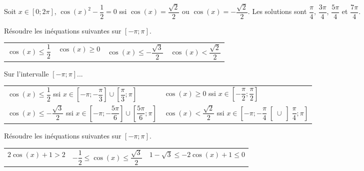 \documentclass[11pt,fleqn, openany]{book} %
\begin{document}
\begin{solution}Soit $x\in[0;2\pi]$, $\cos(x)^2-\dfrac{1}{2}=0$ ssi $\cos(x)=\dfrac{\sqrt{2}}{2}$ ou $\cos(x)=-\dfrac{\sqrt{2}}{2}$. Les solutions sont $\dfrac{\pi}{4}$, $\dfrac{3\pi}{4}$, $\dfrac{5\pi}{4}$ et $\dfrac{7\pi}{4}$.\end{solution}




\begin{exercise}[topic=trig01]Résoudre les inéquations suivantes sur $[-\pi;\pi]$.
\vspace{-0.2cm}

\begin{tabularx}{\linewidth}{XXXX}
$\cos (x) \leqslant \dfrac{1}{2}$ & $\cos (x) \geqslant 0$ & $\cos (x) \leqslant -\dfrac{\sqrt{3}}{2}$ & $\cos (x) < \dfrac{\sqrt{2}}{2}$\\
\end{tabularx}\end{exercise}

\begin{solution}Sur l'intervalle $[-\pi;\pi]$...

\begin{tabularx}{\linewidth}{XX}
$\cos (x) \leqslant \dfrac{1}{2}$ ssi $x \in \left[-\pi ; -\dfrac{\pi}{3}\right] \cup \left[\dfrac{\pi}{3};\pi\right]$ & $\cos (x) \geqslant 0$ ssi $x \in \left[-\dfrac{\pi}{2};\dfrac{\pi}{2}\right]$ \\ $\cos (x) \leqslant -\dfrac{\sqrt{3}}{2}$ ssi $x \in \left[-\pi ; -\dfrac{5\pi}{6}\right] \cup \left[\dfrac{5\pi}{6};\pi\right]$ & $\cos (x) < \dfrac{\sqrt{2}}{2}$ ssi $x \in \left[-\pi ; -\dfrac{\pi}{4}\right[ \cup \left]\dfrac{\pi}{4};\pi\right]$\\
\end{tabularx}\end{solution}



\begin{exercise}[topic=trig01]Résoudre les inéquations suivantes sur $[-\pi;\pi]$.
\vspace{-0.2cm}

\begin{tabularx}{\linewidth}{XXX}

$2\cos(x)+1 > 2$ & $-\dfrac{1}{2} \leqslant \cos(x) \leqslant \dfrac{\sqrt{3}}{2}$ & $   1-\sqrt{3} \leqslant -2\cos(x)+1 \leqslant 0$
\end{tabularx}\end{exercise}
\end{document}
